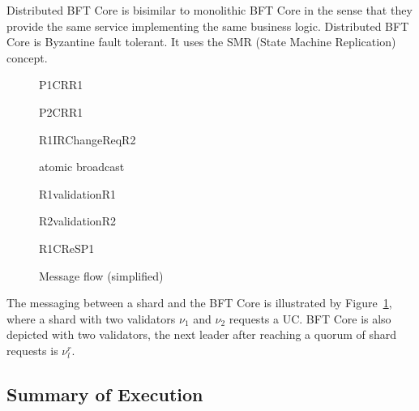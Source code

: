 Distributed BFT Core is bisimilar to monolithic BFT Core in the sense that they provide the same service implementing the same business logic. Distributed BFT Core is Byzantine fault tolerant. It uses the SMR (State Machine Replication) concept.

\begin{figure}[htb]
	\begin{center}
		\begin{sequencediagram}
			\begin{messcall}{P1}{\qquad CR}{R1}
        \begin{messcall}{P2}{CR}{R1}
          \begin{messcall}{R1}{\qquad IRChangeReq}{R2}
          \begin{sdblock}{atomic broadcast}{}
            \prelevel
          \end{sdblock}
          \begin{call}{R1}{\!\!\!\!validation}{R1}{}
          \end{call}
          \prelevel\prelevel
          \begin{call}{R2}{\!\!\!\!validation}{R2}{}
          \end{call}
        \end{messcall}
        \prelevel
        \begin{messcall}{R1}{\qquad CReS}{P1}
        \end{messcall}
        \prelevel
      \end{messcall}
      \prelevel
    \end{messcall}
		\end{sequencediagram}
		\caption{Message flow (simplified)}\label{fi:rootflow}
	\end{center}
\end{figure}

The messaging between a shard and the BFT Core is illustrated by Figure~\ref{fi:rootflow}, where a shard with two validators $\nu_1$ and $\nu_2$ requests a UC. BFT Core is also depicted with two validators, the next leader after reaching a quorum of shard requests is $\nu^r_l$.

\subsection{Summary of Execution}


